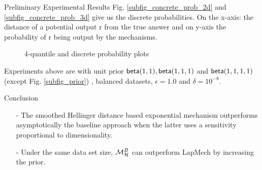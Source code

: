 \documentclass[final,hyperref={pdfpagelabels=false}]{beamer}
\begin{document}
\begin{frame}[t]
\begin{columns}[t]
\begin{column}{.485\textwidth}
\begin{block}{Preliminary Experimental Results}
Fig. \ref{subfig_concrete_prob_2d} and \ref{subfig_concrete_prob_3d} give us the discrete probabilities. On the x-axis: the distance of a potential output r from the true answer and on y-axis the probability of r being output by the mechanisms.
\begin{figure}[H]
\begin{center}
\centering
\caption{4-quantile and discrete probability plots}
\label{fig_concrete_prob}
\end{center}
\end{figure}
\scriptsize{Experiments above are with unit prior $\mathsf{beta}(1,1), \mathsf{beta}(1,1,1)$ and $\mathsf{beta}(1,1,1,1)$ (except Fig. \ref{subfig_prior}) , balanced datasets, $\epsilon = 1.0$ and $\delta = 10^{-8}$.}
\end{block}




\begin{block}{Conclusion}

\begin{itemize}
  \item[-] The smoothed Hellinger distance based exponential mechanism outperforms asymptotically the baseline 
  approach when the latter uses a sensitivity proportional to dimensionality.
  \item[-] Under the same data set size, $\mathcal{M}^{B}_{\mathcal{H}}$ can outperform LapMech by increasing the prior.
    


\end{itemize}
\end{block}
\end{column}
\end{columns}
\end{frame}
\end{document}
